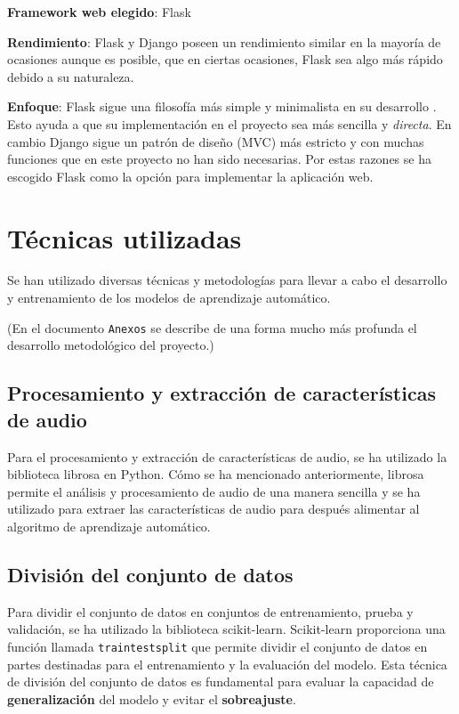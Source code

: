 \textbf{Framework web elegido}: Flask

\textbf{Rendimiento}: Flask y Django poseen un rendimiento similar en la mayoría de ocasiones aunque es posible, que en ciertas ocasiones, Flask sea algo más rápido debido a su naturaleza.

\textbf{Enfoque}: Flask sigue una filosofía más simple y minimalista en su desarrollo \cite{Campbell_2023}. Esto ayuda a que su implementación en el proyecto sea más sencilla y \textit{directa}. En cambio Django sigue un patrón de diseño (MVC) más estricto y con muchas funciones que en este proyecto no han sido necesarias.
Por estas razones se ha escogido Flask como la opción para implementar la aplicación web.

\section{Técnicas utilizadas}

Se han utilizado diversas técnicas y metodologías para llevar a cabo el desarrollo y entrenamiento de los modelos de aprendizaje automático.

(En el documento \texttt{Anexos} se describe de una forma mucho más profunda el desarrollo metodológico del proyecto.)

\subsection{Procesamiento y extracción de características de audio}

Para el procesamiento y extracción de características de audio, se ha utilizado la biblioteca librosa en Python. Cómo se ha mencionado anteriormente, librosa permite el análisis y procesamiento de audio de una manera sencilla y se ha utilizado para extraer las características de audio para después alimentar al algoritmo de aprendizaje automático.

\subsection{División del conjunto de datos}

Para dividir el conjunto de datos en conjuntos de entrenamiento, prueba y validación, se ha utilizado la biblioteca scikit-learn. 
Scikit-learn proporciona una función llamada \texttt{train\textunderscore test\textunderscore split} \cite{scikit_tts} que permite dividir el conjunto de datos en partes destinadas para el entrenamiento y la evaluación del modelo.
Esta técnica de división del conjunto de datos es fundamental para evaluar la capacidad de \textbf{generalización} del modelo y evitar el \textbf{sobreajuste}.

